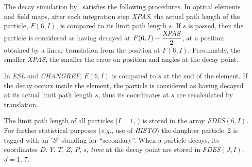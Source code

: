 \bigskip

\noindent The decay simulation by \zgou\  satisfies  the following procedures.
In optical elements and field maps, after each integration step \textsl{XPAS}, the actual 
path length of the particle, $ F(6,I) $, is compared to its limit path length $ s$. 
 If $s $ is passed, then the particle is considered as having decayed at 
 $ F(6,I) - \dfrac{\text{\textsl{XPAS}} }{ 2} $, 
at a position obtained by a linear translation from the position at $ F(6,I)$.
Presumably, the smaller \textsl{XPAS},  the smaller the error on position
and angles at the decay point.  

\bigskip
\begin{figure}[H]
{\setlength{\captionwidth}{15cm}
       }
\end{figure}

\noindent In   \textsl{ESL}   and  \textsl{CHANGREF},  
$ F(6,I) $ is compared to $ s $ at the
end of the element. If the decay occurs inside the element, the particle is considered as having 
decayed at its actual limit path length $ s$,  thus its coordinates 
at $ s $ are recalculated by translation.  
\bigskip

\noindent The limit path length of all particles  ($I=1$, \IMAX{})   is stored in
the array  \textsl{FDES}$(6,I)$.  
For further statistical purposes
(\emph{e.g.}, use of \textsl{HISTO}) the daughter  particle~2    
is tagged with an $ 'S' $ standing for ``secondary''. When a particle decays, 
its coordinates $ D$, $Y$, $T$, $Z$, $P $, $s$, \textsl{time} at the decay point are stored in  
\textsl{FDES}$(J,I)$, \mbox{$ J=1,\, 7$}.  
\bigskip

